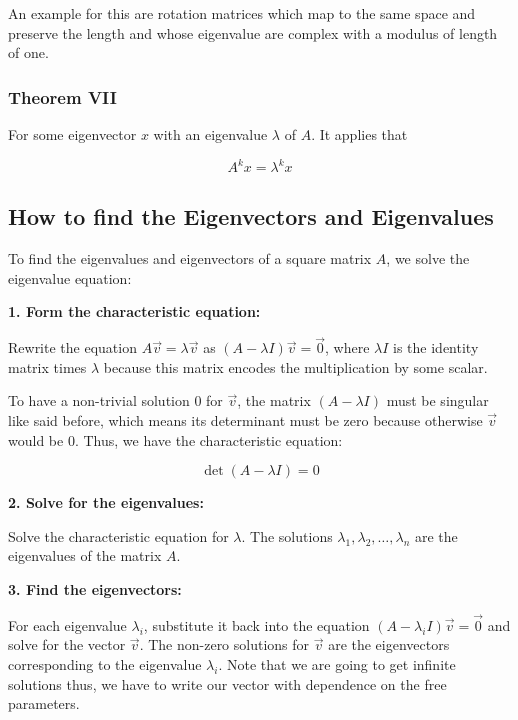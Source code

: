 An example for this are rotation matrices which map to the same space and preserve the length and 
whose eigenvalue are complex with a modulus of length of one.

\subsubsection{Theorem VII}

For some eigenvector \(x\) with an eigenvalue \(\lambda\) of \(A\). It applies that

\[
    A^{k}x = \lambda^{k}x
\]


\subsection{How to find the Eigenvectors and Eigenvalues}

To find the eigenvalues and eigenvectors of a square matrix \(A\), we solve the eigenvalue equation:
\vspace{\baselineskip}

\textbf{1. Form the characteristic equation:}

Rewrite the equation \(A\vec{v} = \lambda\vec{v}\) as 
\((A - \lambda I)\vec{v} = \vec{0}\), where \(\lambda I\) is the identity matrix times \(\lambda\) because 
this matrix encodes the multiplication by some scalar. 
    
To have a non-trivial solution \(0\) for \(\vec{v}\), the matrix \((A - \lambda I)\) must be 
singular like said before, which means its determinant must be zero because otherwise \(\vec{v}\) 
would be 0. Thus, we have the characteristic equation:

\[
    \det(A - \lambda I) = 0
\]

\textbf{2. Solve for the eigenvalues:}

Solve the characteristic equation for \(\lambda\). The solutions 
\(\lambda_1, \lambda_2, \dots, \lambda_n\) are the eigenvalues of the matrix \(A\).
\vspace{\baselineskip}

\textbf{3. Find the eigenvectors:}

For each eigenvalue \(\lambda_i\), substitute it back into the equation 
\((A - \lambda_i I)\vec{v} = \vec{0}\) and solve for the vector \(\vec{v}\). The non-zero 
solutions for \(\vec{v}\) are the eigenvectors corresponding to the eigenvalue 
\(\lambda_i\). Note that we are going to get infinite solutions thus, we have to write 
our vector with dependence on the free 
parameters.
\vspace{\baselineskip}

